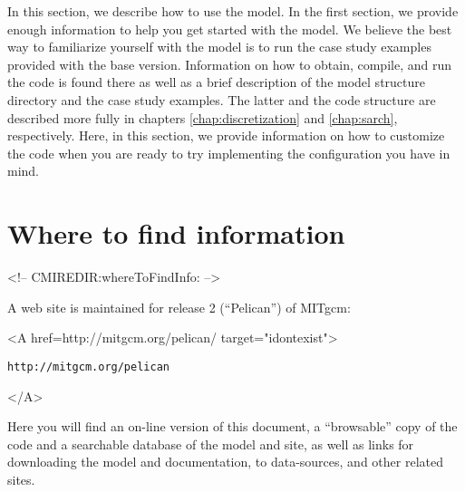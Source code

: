 

In this section, we describe how to use the model. In the first
section, we provide enough information to help you get started with
the model. We believe the best way to familiarize yourself with the
model is to run the case study examples provided with the base
version. Information on how to obtain, compile, and run the code is
found there as well as a brief description of the model structure
directory and the case study examples.  The latter and the code
structure are described more fully in chapters
\ref{chap:discretization} and \ref{chap:sarch}, respectively. Here, in
this section, we provide information on how to customize the code when
you are ready to try implementing the configuration you have in mind.


\section{Where to find information}
\label{sect:whereToFindInfo}
\begin{rawhtml}
<!-- CMIREDIR:whereToFindInfo: -->
\end{rawhtml}

A web site is maintained for release 2 (``Pelican'') of MITgcm:
\begin{rawhtml} <A href=http://mitgcm.org/pelican/ target="idontexist"> \end{rawhtml}
\begin{verbatim}
http://mitgcm.org/pelican
\end{verbatim}
\begin{rawhtml} </A> \end{rawhtml}
Here you will find an on-line version of this document, a
``browsable'' copy of the code and a searchable database of the model
and site, as well as links for downloading the model and
documentation, to data-sources, and other related sites.

